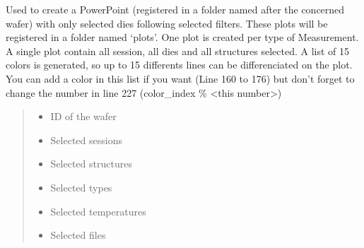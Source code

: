 \documentclass[letterpaper,10pt,english]{sphinxmanual}
\begin{document}

\begin{fulllineitems}
\label{\detokenize{plot_and_powerpoint:plot_and_powerpoint.wanted_ppt}}
\pysigstartsignatures
{}
\pysigstopsignatures
\sphinxAtStartPar
Used to create a PowerPoint (registered in a folder named after the concerned wafer) with only selected dies following selected filters. These plots will be registered in a folder named ‘plots’.
One plot is created per type of Measurement.
A single plot contain all session, all dies and all structures selected. A list of 15 colors is generated, so up to 15 differents lines can be differenciated on the plot.
You can add a color in this list if you want (Line 160 to 176) but don’t forget to change the number in line 227 (color\_index \% \textless{}this number\textgreater{})
\begin{quote}\begin{description}
\begin{itemize}
\item {} 
\sphinxAtStartPar
{} \textendash{} ID of the wafer

\item {} 
\sphinxAtStartPar
{} \textendash{} Selected sessions

\item {} 
\sphinxAtStartPar
{} \textendash{} Selected structures

\item {} 
\sphinxAtStartPar
{} \textendash{} Selected types

\item {} 
\sphinxAtStartPar
{} \textendash{} Selected temperatures

\item {} 
\sphinxAtStartPar
{} \textendash{} Selected files


\end{itemize}
\end{description}
\end{quote}
\end{fulllineitems}
\end{document}
